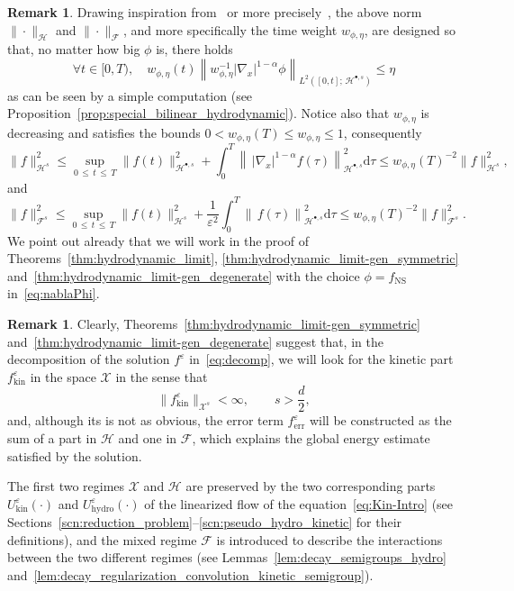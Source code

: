 \documentclass[10pt]{amsart}
\theoremstyle{definition}\newtheorem{defi}[theo]{Definition}\newtheorem{rema}[theo]{Remark}\newtheorem{exam}[theo]{Example}\newtheorem{exem}[theo]{Example}\newtheorem{nota}[theo]{Notation}
\newcommand{\err}{\mathrm{err}}
\newcommand{\ns}{\mathrm{NS}}
\newcommand{\hyd}{\mathrm{hydro}}
\newcommand{\kin}{\mathrm{kin}}
\renewcommand{\d}{\mathrm{d}}
\newcommand{\HH}{\mathcal{H}}
\newcommand{\FFF}{\mathscr{F}}
\newcommand{\HHH}{\mathscr{H}}
\newcommand{\GGG}{\mathscr{X}}
\newcommand{\rSSs}[1]{\HH^{#1}}
\newcommand{\rSSsp}[1]{\HH^{{\bullet}, #1}}
\newcommand{\SSSs}{\HHH}
\newcommand{\rSSSs}[1]{\HHH^{#1}}
\newcommand{\SSSl}{\GGG}
\newcommand{\rSSSl}[1]{\GGG^{#1}}
\newcommand{\SSSm}{\FFF}
\newcommand{\rSSSm}[1]{\FFF^{#1}}
\renewcommand*\le{\leqslant}
\renewcommand*\leq{\leqslant}
\newcommand*\eps{{\varepsilon}}
\let\oldforall\forall
\renewcommand*{\forall}{\mathrel{\oldforall}}
\begin{document}
\begin{rema}
Drawing inspiration from~\cite{GT2020} or more precisely~\cite{G2023}, the above norm $\|\cdot\|_{\SSSs}$ and $\| \cdot \|_\SSSm$, and more specifically the time weight $w_{\phi, \eta}$, are designed so that, no matter how big $\phi$ is, there holds
\begin{equation}\label{eq:NS_exponential_weight}
\forall t \in [0, T), \quad w_{\phi, \eta}(t) \left\| w_{\phi, \eta}^{-1} | \nabla_{x} |^{1-\alpha} \phi \right\|_{L^2 \left([0, t] ;\, {\rSSsp{s}} \right) } \le \eta
\end{equation}
as can be seen by a simple computation (see Proposition~\ref{prop:special_bilinear_hydrodynamic}). Notice also that $w_{\phi, \eta}$ is decreasing and satisfies the bounds $0 < w_{\phi, \eta}(T) \le w_{\phi, \eta} \le 1$, consequently
\begin{equation}\label{eq:roughNt}
\| f \|_{\rSSSs{s}}^2 \le \sup_{0\,\leq\,t\,\leq\,T}\|f(t)\|_{\rSSsp{s}}^2+\int_0^T\left\|\,|\nabla_x|^{1-\alpha}f(\tau)\right\|_{\rSSsp{s}}^2\d \tau \le w_{\phi, \eta}(T)^{-2} \| f \|_{\rSSSs{s}}^2,
\end{equation}
and
\begin{equation*}
\| f \|_{\rSSSm{s}}^2 \le \sup_{0\,\leq\,t\,\leq\,T}\|f(t)\|_{\rSSs{s}}^2 + \frac{1}{\eps^2} \int_0^T\left\|\,f(\tau)\right\|_{\rSSsp{s}}^2\d \tau \le w_{\phi, \eta}(T)^{-2} \| f \|_{\rSSSm{s}}^2.
\end{equation*}
We point out already that we will work in the proof of Theorems~\ref{thm:hydrodynamic_limit}, \ref{thm:hydrodynamic_limit-gen_symmetric} and~\ref{thm:hydrodynamic_limit-gen_degenerate} with the choice $\phi=f_\ns$ in~\eqref{eq:nablaPhi}.
\end{rema}

\begin{rema}
Clearly, Theorems~\ref{thm:hydrodynamic_limit-gen_symmetric} and~\ref{thm:hydrodynamic_limit-gen_degenerate} suggest that, in the decomposition of the solution $f^\eps$ in~\eqref{eq:decomp}, we will look for the kinetic part $f^\eps_\kin$ in the space $\SSSl$ in the sense that
\[
\| f^\eps_\kin\|_{\rSSSl{s}} < \infty, \qquad s >\frac{d}{2},
\]
and, although its is not as obvious, the error term $f^\eps_\err$ will be constructed as the sum of a part in $\SSSs$ and one in $\SSSm$, which explains the global energy estimate satisfied by the solution.

The first two regimes $\SSSl$ and $\SSSs$ are preserved by the two corresponding parts $U^\eps_\kin(\cdot)$ and $U^\eps_\hyd(\cdot)$ of the linearized flow of the equation~\eqref{eq:Kin-Intro} (see Sections~\ref{scn:reduction_problem}--\ref{scn:pseudo_hydro_kinetic} for their definitions), and the mixed regime $\SSSm$ is introduced to describe the interactions between the two different regimes (see Lemmas~\ref{lem:decay_semigroups_hydro} and~\ref{lem:decay_regularization_convolution_kinetic_semigroup}).
\end{rema}
\end{document}
